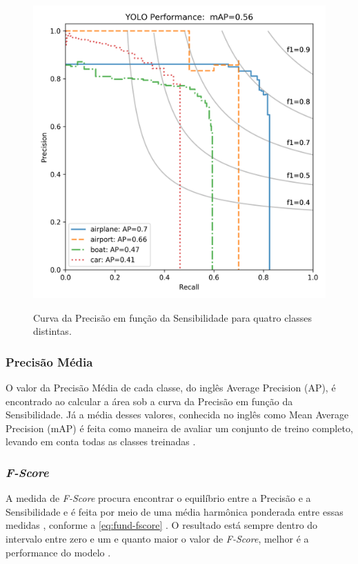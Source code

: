 \begin{figure}[h!] %
  \centering
  \caption{Curva da Precisão em função da Sensibilidade para quatro classes distintas.}
  \includegraphics[scale=0.6]{img/img-fundamentacao-prcurve.png}
  \label{fig:fund-prcurve}
\end{figure}

\subsubsection{Precisão Média} \label{cap:fund-ia-metricas-pmed}
O valor da Precisão Média de cada classe, do inglês Average Precision (AP), é encontrado ao calcular a área sob a curva da Precisão em função da Sensibilidade. Já a média desses valores, conhecida no inglês como Mean Average Precision (mAP) é feita como maneira de avaliar um conjunto de treino completo, levando em conta todas as classes treinadas \cite{ref:Tan}.

\subsubsection{\textit{F-Score}} \label{cap:fund-ia-metricas-fscore}
A medida de \textit{F-Score} procura encontrar o equilíbrio entre a Precisão e a Sensibilidade \cite{ref:Mishra} e é feita por meio de uma média harmônica ponderada entre essas medidas \cite{ref:Batarseh-Yang}, conforme a \autoref{eq:fund-fscore} . O resultado está sempre dentro do intervalo entre zero e um e quanto maior o valor de \textit{F-Score}, melhor é a performance do modelo \cite{ref:Mishra}.

